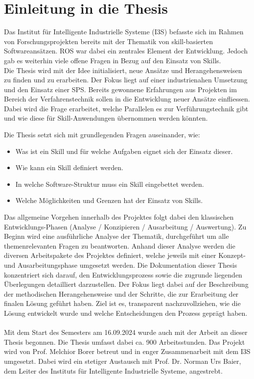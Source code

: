 \section{Einleitung in die Thesis} \label{Einleitung in die Thesis}

Das Institut für Intelligente Industrielle Systeme (I3S) befasste sich im Rahmen von Forschungsprojekten bereits mit der Thematik von skill-basierten Softwareansätzen. ROS war dabei ein zentrales Element der Entwicklung. Jedoch gab es weiterhin viele offene Fragen in Bezug auf den Einsatz von Skills. 
\\
Die Thesis wird mit der Idee initialisiert, neue Ansätze und Herangehensweisen zu finden und zu erarbeiten. Der Fokus liegt auf einer industrienahen Umsetzung und den Einsatz einer SPS. Bereits gewonnene Erfahrungen aus Projekten im Bereich der Verfahrenstechnik sollen in die Entwicklung neuer Ansätze einfliessen. Dabei wird die Frage erarbeitet, welche Parallelen es zur Verführungstechnik gibt und wie diese für Skill-Anwendungen übernommen werden könnten. 
 
\vspace{2mm} 
Die Thesis setzt sich mit grundlegenden Fragen auseinander, wie:
\begin{itemize}
	\item Was ist ein Skill und für welche Aufgaben eignet sich der Einsatz dieser.
	\item Wie kann ein Skill definiert werden.
	\item In welche Software-Struktur muss ein Skill eingebettet werden. 
	\item Welche Möglichkeiten und Grenzen hat der Einsatz von Skills.
\end{itemize}
\vspace{3mm} 

Das allgemeine Vorgehen innerhalb des Projektes folgt dabei den klassischen Entwicklungs-Phasen (Analyse / Konzipieren / Ausarbeitung / Auswertung). Zu Beginn wird eine ausführliche Analyse der Thematik, durchgeführt um alle themenrelevanten Fragen zu beantworten. Anhand dieser Analyse werden die diversen Arbeitspakete des Projektes definiert, welche jeweils mit einer Konzept- und Ausarbeitungsphase umgesetzt werden. Die Dokumentation dieser Thesis konzentriert sich darauf, den Entwicklungsprozess sowie die zugrunde liegenden Überlegungen detailliert darzustellen. Der Fokus liegt dabei auf der Beschreibung der methodischen Herangehensweise und der Schritte, die zur Erarbeitung der finalen Lösung geführt haben. Ziel ist es, transparent nachzuvollziehen, wie die Lösung entwickelt wurde und welche Entscheidungen den Prozess geprägt haben.
\\
\\
Mit dem Start des Semesters am 16.09.2024 wurde auch mit der Arbeit an dieser Thesis begonnen. Die Thesis umfasst dabei ca. 900 Arbeitsstunden.  Das Projekt wird von Prof. Melchior Borer betreut und in enger Zusammenarbeit mit dem I3S umgesetzt. Dabei wird ein stetiger Austausch mit Prof. Dr. Norman Urs Baier, dem Leiter des Instituts für Intelligente Industrielle Systeme, angestrebt.  
	
